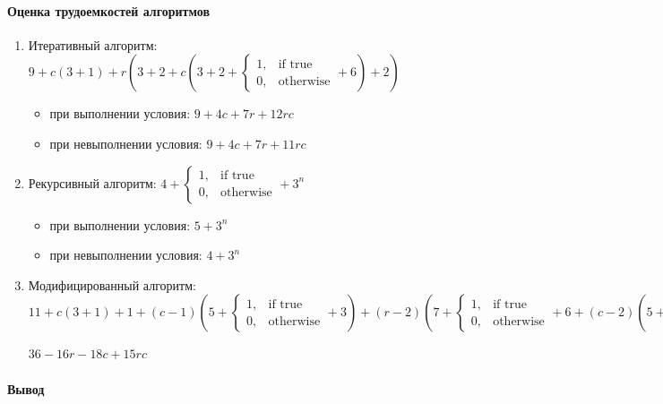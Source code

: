 \documentclass[utf8x, 12pt]{G7-32} %
\begin{document}
\paragraph{Оценка трудоемкостей алгоритмов}
\begin{enumerate}
	\item Итеративный алгоритм: $9 + c(3 + 1) + r(3 + 2 + c(3 + 2 + 
	\begin{cases}
	1,& \text{if true}\\
	0,& \text{otherwise}
	\end{cases}
	 + 6) + 2)$
	\begin{itemize}
		\item при выполнении условия: $9 + 4c + 7r + 12rc$
		\item при невыполнении условия: $9 + 4c + 7r + 11rc$
	\end{itemize}
	\item Рекурсивный алгоритм: $4 + 
	\begin{cases}
	1,& \text{if true}\\
	0,& \text{otherwise}
	\end{cases}
	+ 3^n$
	\begin{itemize}
		\item при выполнении условия: $5 + 3^n$
		\item при невыполнении условия: $4 + 3^n$
	\end{itemize}
	\item Модифицированный алгоритм: $11 + c(3 + 1) + 1 + (c - 1)(5 + \begin{cases} 1,& \text{if true}\\0,& \text{otherwise}\end{cases} + 3) + (r - 2)(7 + \begin{cases} 1,& \text{if true}\\0,& \text{otherwise}\end{cases} + 6 + (c - 2)(5 + \begin{cases} 1,& \text{if true}\\0,& \text{otherwise}\end{cases} + 10) + 3) \simeq $
	\begin{center}
		$36 - 16r - 18c + 15rc$
	\end{center}
\end{enumerate}

\newpage

\paragraph{Вывод}
\end{document}
